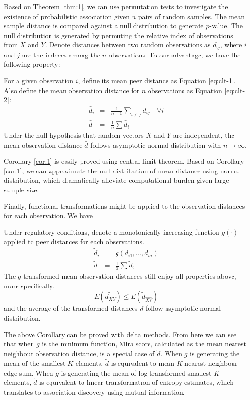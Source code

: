 \documentclass{sig-alternate}
\begin{document}
Based on Theorem \ref{thm:1}, we can use permutation tests to
investigate the existence of probabilistic association given $n$ pairs
of \iid{} random samples. The mean sample distance is compared against
a null distribution to generate $p$-value. The null distribution is
generated by permuting the relative index of observations from $X$ and
$Y$. Denote distances between two random observations as $d_{ij}$,
where $i$ and $j$ are the indeces among the $n$ observations. To our
advantage, we have the following property:
\begin{cor}
  \label{cor:1}
  For a given observation $i$, define its mean peer distance as
  Equation \ref{eq:clt-1}. Also define the mean observation distance
  for $n$ observations as Equation \ref{eq:clt-2}:
  \begin{eqnarray}
    \bar{d}_i &=& \frac{1}{n-1}\sum_{i\ne j} d_{ij} \quad{} \forall i \label{eq:clt-1}\\
    \bar{d} &=& \frac{1}{n}\sum \bar{d}_{i} \label{eq:clt-2}
  \end{eqnarray}
  Under the null hypothesis that random vectors $X$ and $Y$ are
  independent, the mean observation distance $\bar{d}$ follows
  asymptotic normal distribution with $n \to \infty$.
\end{cor}
Corollary \ref{cor:1} is easily proved using central limit theorem.
Based on Corollary \ref{cor:1}, we can approximate the null
distribution of mean distance using normal distribution, which
dramatically alleviate computational burden given large sample size.

Finally, functional transformations might be applied to the
observation distances for each observation. We have
\begin{cor}
  \label{cor:2}
  Under regulatory conditions, denote a monotonically increasing
  function $g(\cdot)$ applied to peer distances for each observations.
  \begin{eqnarray}
    \tilde{d}_i &=& g(d_{i1} ,\ldots, d_{in}) \nonumber \\
    \tilde{d} &=& \frac{1}{n}\sum \tilde{d}_{i} \label{eq:general-equation}
  \end{eqnarray}
  The $g$-transformed mean observation distances still enjoy all
  properties above, more specifically: 
  \begin{displaymath}
    E(\tilde{d_{XY}}) \le E(\tilde{d}_{\hat{X}\hat{Y}})
  \end{displaymath}
  and the average of the transformed distances $\tilde{d}$ follow
  asymptotic normal distribution.
\end{cor}
The above Corollary can be proved with delta methods. From here we can
see that when $g$ is the minimum function, Mira score, calculated as
the mean nearest neighbour observation distance, is a special case of
$\tilde{d}$. When $g$ is generating the mean of the smallest $K$
elements, $\tilde{d}$ is equivalent to mean $K$-nearest neighbour edge
sum. When $g$ is generating the mean of log-transformed smallest $K$
elements, $\tilde{d}$ is equivalent to linear transformation of
entropy estimates, which translates to association discovery using
mutual information.
\end{document}
